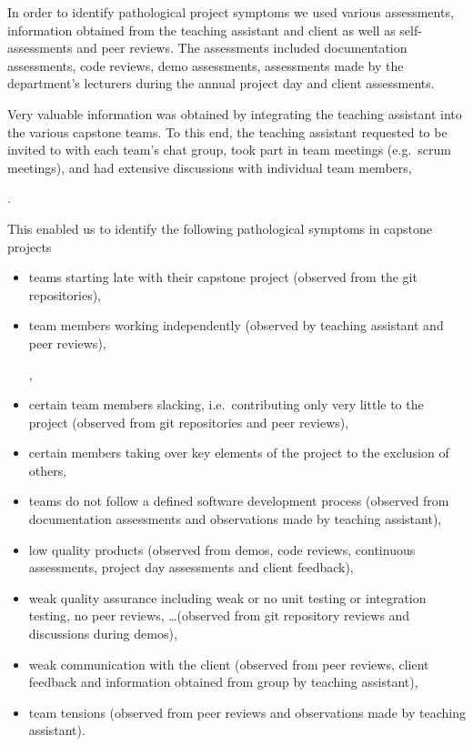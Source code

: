In order to identify pathological project symptoms we used  various assessments, information obtained from the teaching assistant and client as well as self-assessments and peer reviews. The assessments included documentation assessments, code reviews, demo assessments, assessments made by the department's lecturers during the annual project day and client assessments. 

Very valuable information was obtained by integrating the teaching assistant into the various capstone teams. To this end, the teaching assistant requested to be invited to  with each team's chat group, took part in team meetings (e.g.\ scrum meetings), and had extensive discussions with individual team members, 

.   

This enabled us to identify the following pathological symptoms in capstone projects
\begin{itemize}
  \item teams starting late with their capstone project (observed from the git repositories),
  \item team members working independently (observed by teaching assistant and peer reviews),
  
  , 
  
  \item certain team members slacking, i.e.\ contributing only very little to the project (observed from git repositories and peer reviews),
  \item certain members taking over key elements of the project to the exclusion of others,
  \item teams do not follow a defined software development process (observed from documentation assessments and observations made by teaching assistant),
  \item low quality products (observed from demos, code reviews, continuous assessments, project day assessments and client feedback),
  \item weak quality assurance including weak or no unit testing or integration testing, no peer reviews, \ldots (observed from git repository reviews and discussions during demos),
  \item weak communication with the client (observed from peer reviews, client feedback and information obtained from group by teaching assistant),
  \item team tensions (observed from peer reviews and observations made by teaching assistant).
\end{itemize}


